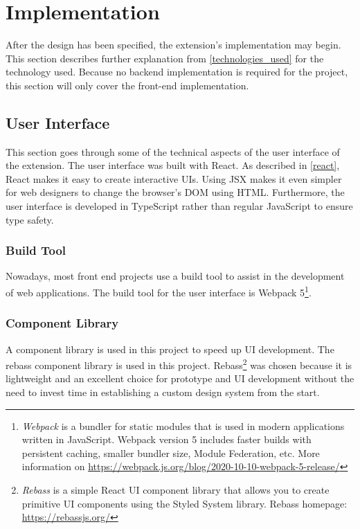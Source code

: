 \newpage
\chapter{Implementation}
After the design has been specified, the extension's implementation may begin. This section describes further explanation from \autoref{technologies_used} for the technology used. Because no backend implementation is required for the project, this section will only cover the front-end implementation.

\section{User Interface}
This section goes through some of the technical aspects of the user interface of the extension. The user interface was built with React. As described in \autoref{react}, React makes it easy to create interactive UIs. Using JSX makes it even simpler for web designers to change the browser's DOM using HTML. Furthermore, the user interface is developed in TypeScript rather than regular JavaScript to ensure type safety.

\subsection{Build Tool}
Nowadays, most front end projects use a build tool to assist in the development of web applications. The build tool for the user interface is Webpack 5\footnote{\emph{Webpack} is a bundler for static modules that is used in modern applications written in JavaScript. Webpack version 5 includes faster builds with persistent caching, smaller bundler size, Module Federation, etc. More information on \url{https://webpack.js.org/blog/2020-10-10-webpack-5-release/}}.

\subsection{Component Library}
A component library is used in this project to speed up UI development. The rebass component library is used in this project. Rebass\footnote{\emph{Rebass} is a simple React UI component library that allows you to create primitive UI components using the Styled System library. Rebass homepage: \url{https://rebassjs.org/}} was chosen because it is lightweight and an excellent choice for prototype and UI development without the need to invest time in establishing a custom design system from the start.

